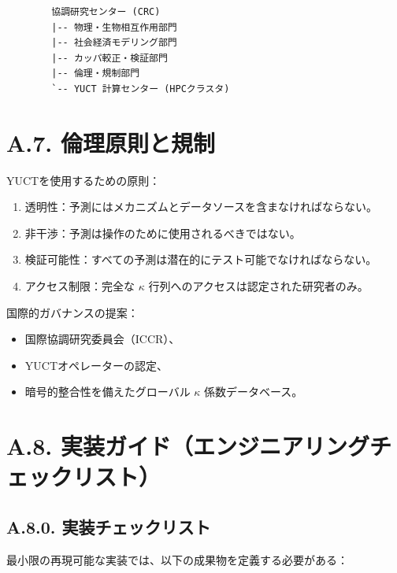 \documentclass[13pt,a4paper]{ltjsarticle}
\begin{document}
	\begin{lstlisting}
		協調研究センター (CRC)
		|-- 物理・生物相互作用部門
		|-- 社会経済モデリング部門
		|-- カッパ較正・検証部門
		|-- 倫理・規制部門
		`-- YUCT 計算センター (HPCクラスタ)
	\end{lstlisting}
	
	\section*{A.7. 倫理原則と規制}
	
	YUCTを使用するための原則：
	\begin{enumerate}[leftmargin=*]
		\item 透明性：予測にはメカニズムとデータソースを含まなければならない。
		\item 非干渉：予測は操作のために使用されるべきではない。
		\item 検証可能性：すべての予測は潜在的にテスト可能でなければならない。
		\item アクセス制限：完全な $\kappa$ 行列へのアクセスは認定された研究者のみ。
	\end{enumerate}
	
	国際的ガバナンスの提案：
	\begin{itemize}[leftmargin=*]
		\item 国際協調研究委員会（ICCR）、
		\item YUCTオペレーターの認定、
		\item 暗号的整合性を備えたグローバル $\kappa$ 係数データベース。
	\end{itemize}
	
	\section*{A.8. 実装ガイド（エンジニアリングチェックリスト）}
	
	\subsection*{A.8.0. 実装チェックリスト}
	最小限の再現可能な実装では、以下の成果物を定義する必要がある：
	
\end{document}
